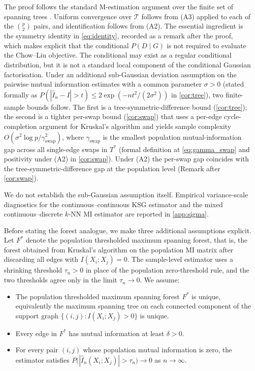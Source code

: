 The proof follows the standard M-estimation argument over the finite
set of spanning trees \citep{vandervaart2000asymptotic}. Uniform
convergence over $\mathcal{T}$ follows from (A3) applied to each of
the $\binom{p}{2}$ pairs, and identification follows from (A2). The
essential ingredient is the symmetry identity in
\cref{eq:identity}, recorded as a remark after the proof, which
makes explicit that the conditional $P(D \mid G)$ is not required
to evaluate the Chow--Liu objective. The conditional may exist as a
regular conditional distribution, but it is not a standard local
component of the conditional Gaussian factorisation. Under an
additional sub-Gaussian deviation assumption on the pairwise mutual
information estimates with a common parameter $\sigma > 0$ (stated
formally as $P(|\hat{I}_n - I| > t) \le 2 \exp(-n t^2 / (2 \sigma^2))$
in \cref{cor:tree}), two finite-sample bounds follow. The first
is a tree-symmetric-difference bound (\cref{cor:tree}); the second
is a tighter per-swap bound (\cref{cor:swap}) that uses a per-edge
cycle-completion argument for Kruskal's algorithm and yields sample
complexity $O(\sigma^2 \log p / \gamma_{\mathrm{swap}}^2)$, where
$\gamma_{\mathrm{swap}}$ is the smallest population
mutual-information gap across all single-edge swaps in $T^*$
(formal definition at \eqref{eq:gamma_swap} and positivity under
(A2) in \cref{cor:swap}). Under (A2) the
per-swap gap coincides with the tree-symmetric-difference gap at
the population level (Remark after \cref{cor:swap}).

We do not establish the sub-Gaussian assumption itself.
Empirical variance-scale diagnostics for the continuous--continuous
KSG estimator and the mixed continuous--discrete $k$-NN MI
estimator \citep{gao2017estimating} are reported in
\cref{app:sigma}.

Before stating the forest analogue, we make three additional
assumptions explicit. Let $F^*$ denote the population thresholded
maximum spanning forest, that is, the forest obtained from Kruskal's
algorithm on the population MI matrix after discarding all edges
with $I(X_i; X_j) = 0$. The sample-level estimator uses a
shrinking threshold $\tau_n > 0$ in place of the population
zero-threshold rule, and the two thresholds agree only in the
limit $\tau_n \to 0$. We assume:
\begin{itemize}
\item[(A2$'$)] The population thresholded maximum spanning forest
$F^*$ is unique, equivalently the maximum spanning tree on each
connected component of the support graph
$\{(i, j) : I(X_i; X_j) > 0\}$ is unique.
\item[(A4)] Every edge in $F^*$ has mutual information at least
$\delta > 0$.
\item[(A5)] For every pair $(i, j)$ whose population mutual
information is zero, the estimator satisfies
$P\bigl(|\hat{I}_n(X_i; X_j)| > \tau_n\bigr) \to 0$
as $n \to \infty$.
\end{itemize}

